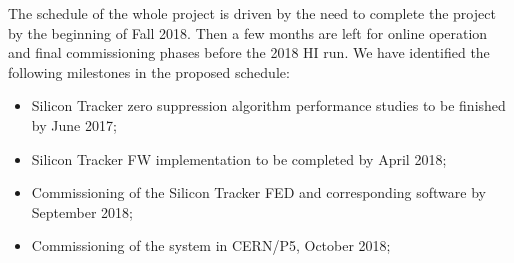 
The schedule of the whole project is driven by the need to complete the project by the beginning of Fall 2018. Then a few months are left for online operation and final commissioning phases before the 2018 HI run. We have identified the following milestones in the proposed schedule:

\begin{itemize}
\item Silicon Tracker zero suppression algorithm performance studies to be finished by June 2017;
\item Silicon Tracker FW implementation to be completed by April 2018;
\item Commissioning of the Silicon Tracker FED and corresponding software by September 2018;
\item Commissioning of the system in CERN/P5, October 2018;
\end{itemize}
